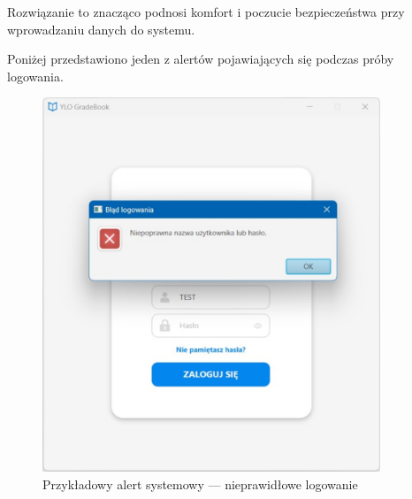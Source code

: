 Rozwiązanie to znacząco podnosi komfort i poczucie bezpieczeństwa przy wprowadzaniu danych do systemu.

Poniżej przedstawiono jeden z alertów pojawiających się podczas próby logowania.
\begin{figure}[H]
    \centering
    \includegraphics[width=0.9\textwidth]{figures/fig_0020.eps}
    \caption{Przykładowy alert systemowy — nieprawidłowe logowanie}
    \label{fig:alert}
\end{figure}

